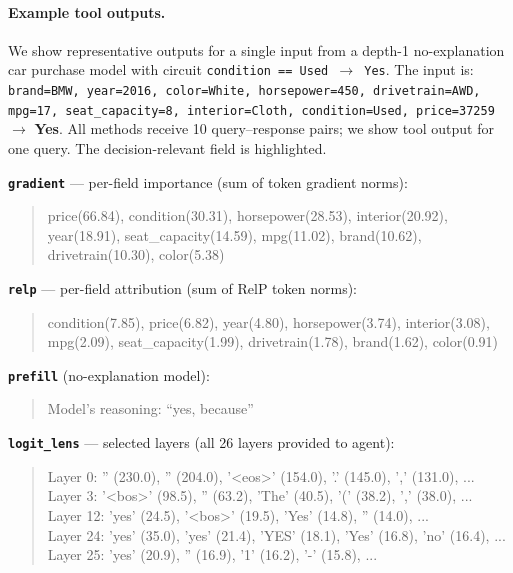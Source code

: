 \documentclass{article} %
\begin{document}
\paragraph{Example tool outputs.}
We show representative outputs for a single input from a depth-1 no-explanation car purchase model with circuit \texttt{condition == Used $\to$ Yes}.
The input is: \texttt{brand=BMW, year=2016, color=White, horsepower=450, drivetrain=AWD, mpg=17, seat\_capacity=8, interior=Cloth, condition=Used, price=37259} $\to$ \textbf{Yes}.
All methods receive 10 query--response pairs; we show tool output for one query. The decision-relevant field is \colorbox{gradrow}{highlighted}.

\smallskip\noindent\textbf{\texttt{gradient}} --- per-field importance (sum of token gradient norms):
\begin{quote}\small\ttfamily
price(66.84), \colorbox{gradrow}{condition(30.31)}, horsepower(28.53), interior(20.92), year(18.91), seat\_capacity(14.59), mpg(11.02), brand(10.62), drivetrain(10.30), color(5.38)
\end{quote}

\noindent\textbf{\texttt{relp}} --- per-field attribution (sum of RelP token norms):
\begin{quote}\small\ttfamily
\colorbox{gradrow}{condition(7.85)}, price(6.82), year(4.80), horsepower(3.74), interior(3.08), mpg(2.09), seat\_capacity(1.99), drivetrain(1.78), brand(1.62), color(0.91)
\end{quote}

\smallskip\noindent\textbf{\texttt{prefill}} (no-explanation model):
\begin{quote}\small\ttfamily
Model's reasoning: ``yes, because''
\end{quote}

\smallskip\noindent\textbf{\texttt{logit\_lens}} --- selected layers (all 26 layers provided to agent):
\begin{quote}\small\ttfamily
Layer 0: '' (230.0), '' (204.0), '<eos>' (154.0), '.' (145.0), ',' (131.0), ...\\
Layer 3: '<bos>' (98.5), '' (63.2), 'The' (40.5), '(' (38.2), ',' (38.0), ...\\
Layer 12: 'yes' (24.5), '<bos>' (19.5), 'Yes' (14.8), '' (14.0), ...\\
Layer 24: 'yes' (35.0), 'yes' (21.4), 'YES' (18.1), 'Yes' (16.8), 'no' (16.4), ...\\
Layer 25: 'yes' (20.9), '' (16.9), '1' (16.2), '-' (15.8), ...
\end{quote}
\end{document}
